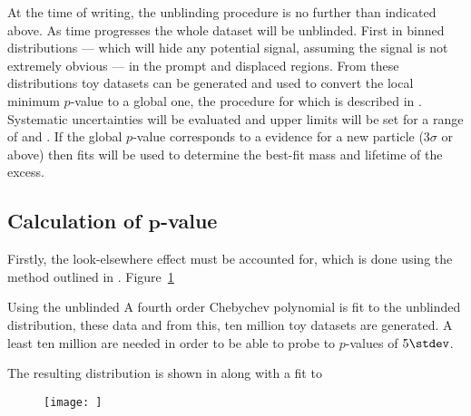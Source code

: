 At the time of writing, the unblinding procedure is no further than indicated above.
As time progresses the whole dataset will be unblinded.
First in binned distributions
--- which will hide any potential signal, assuming the signal is not extremely obvious ---
in the prompt and displaced regions.
From these distributions toy datasets can be generated and used to convert the local minimum
$p$-value to a global one, the procedure for which is described in .
Systematic uncertainties will be evaluated and upper limits will be set for a range of \mass{\db}
and \lifetime{\db}.
If the global $p$-value corresponds to a evidence for a new particle
($3\sigma$ or above) then fits will be used to
determine the best-fit mass and lifetime of the excess.


\subsection[Calculation of $p$-value]
{Calculation of $\boldsymbol{p}$-value}

Firstly, the look-elsewhere effect must be accounted for, which
is done using the method outlined in .
Figure~\ref{fig:db:mmumu}


Using the unblinded
A fourth order Chebychev polynomial is fit to the unblinded \mass{\mumu} distribution,
these data
and
from this, ten million toy datasets are generated.
A least ten million are needed in order to be able to probe to $p$-values of $5\stdev$.

The resulting \qsq distribution is shown in  along with a fit to


\begin{figure}
  \begin{center}
    \texttt{[image: ]}
    \caption{
    }
    \label{fig:db:mmumu}
  \end{center}
\end{figure}












